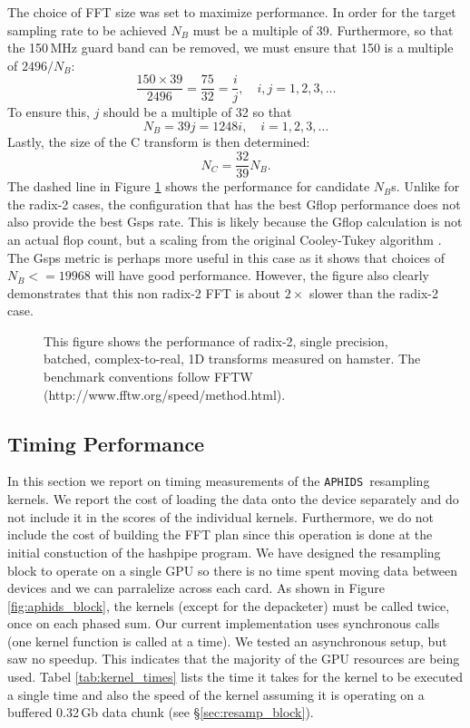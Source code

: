 \documentclass[11pt,preprint]{aastex}
\newcommand{\APHIDS}{\texttt{APHIDS}}
\begin{document}
The choice of FFT size was set to maximize performance.  In order for the target sampling rate to be achieved
$N_B$ must be a multiple of 39.  Furthermore, so that the 150\,MHz guard band can be removed, we must ensure that 
150 is a multiple of $2496/N_B$:
\begin{equation}
\frac{150\times39}{2496} = \frac{75}{32} = \frac{i}{j}, \quad i,j = 1, 2,3, \ldots
\end{equation}
To ensure this, $j$ should be a multiple of 32 so that 
\begin{equation}
N_B = 39j = 1248i, \quad i=1,2,3,\ldots
\end{equation}
Lastly, the size of the C transform is then determined:
\begin{equation}
N_C = \frac{32}{39} N_B.
\end{equation}
The dashed line in Figure \ref{fig:C2R_performance} shows the performance for candidate $N_B$s.  Unlike for 
the radix-2 cases, the configuration that has the best Gflop performance does not also provide the best Gsps
rate.  This is likely because the Gflop calculation is not an actual flop count, but a scaling from the 
original Cooley-Tukey algorithm \citep{cooley65}.  The Gsps metric is perhaps more useful in this case as it
shows that choices of $N_B <= 19968$ will have good performance.  However, the figure also clearly demonstrates
that this non radix-2 FFT is about $2\times$ slower than the radix-2 case.


\begin{figure}[H!]
\caption{This figure shows the performance of radix-2, single precision, batched, complex-to-real, 1D transforms 
measured on hamster. The benchmark conventions follow FFTW  (http://www.fftw.org/speed/method.html).}
\label{fig:C2R_performance}
\end{figure}

\subsection{Timing Performance}

In this section we report on timing measurements of the \APHIDS\, resampling kernels.  We report the cost of 
loading the data onto the device separately and do not include it in the scores of the individual kernels.  
Furthermore, we do not include the cost of building the FFT plan since this operation is done at the initial
constuction of the hashpipe program.
We have designed the resampling block to operate on a single GPU so there is no time spent moving data 
between devices and we can parralelize across each card.  As shown in Figure \ref{fig:aphids_block}, the
kernels (except for the depacketer) must be called
twice, once on each phased sum.  Our current implementation uses synchronous calls (one kernel function is 
called at a time).  We tested an asynchronous setup, but saw no speedup.  This indicates that the majority of 
the GPU resources are being used.  Tabel \ref{tab:kernel_times} lists the time it takes for the kernel to be 
executed a single time and also the speed of the kernel assuming it is operating on a buffered 0.32\,Gb data 
chunk (see \S\ref{sec:resamp_block}).
\end{document}
